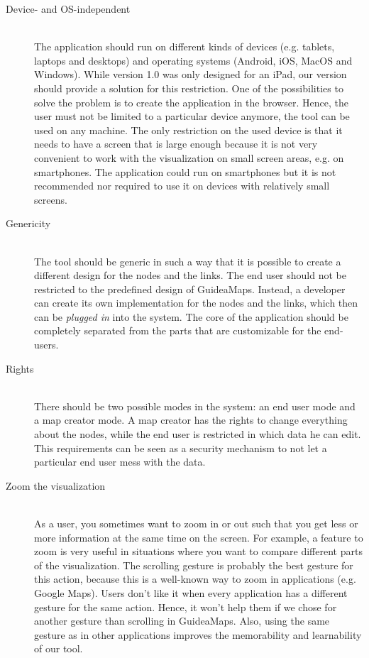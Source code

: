 \begin{description}

	\item[Device- and OS-independent] \hfill \\
	The application should run on different kinds of devices (e.g. tablets, laptops and desktops) and operating systems (Android, iOS, MacOS and Windows). While version 1.0 was only designed for an iPad, our version should provide a solution for this restriction. One of the possibilities to solve the problem is to create the application in the browser. Hence, the user must not be limited to a particular device anymore, the tool can be used on any machine. The only restriction on the used device is that it needs to have a screen that is large enough because it is not very convenient to work with the visualization on small screen areas, e.g. on smartphones. The application could run on smartphones but it is not recommended nor required to use it on devices with relatively small screens.
  
	\item[Genericity] \hfill \\
  The tool should be generic in such a way that it is possible to create a different design for the nodes and the links. The end user should not be restricted to the predefined design of GuideaMaps. Instead, a developer can create its own implementation for the nodes and the links, which then can be \textit{plugged in} into the system. The core of the application should be completely separated from the parts that are customizable for the end-users.
  
	\item[Rights] \hfill \\
	There should be two possible modes in the system: an end user mode and a map creator mode. A map creator has the rights to change everything about the nodes, while the end user is restricted in which data he can edit. This requirements can be seen as a security mechanism to not let a particular end user mess with the data.
  
	\item[Zoom the visualization] \hfill \\
	As a user, you sometimes want to zoom in or out such that you get less or more information at the same time on the screen. For example, a feature to zoom is very useful in situations where you want to compare different parts of the visualization. The scrolling gesture is probably the best gesture for this action, because this is a well-known way to zoom in applications (e.g. Google Maps). Users don't like it when every application has a different gesture for the same action. Hence, it won't help them if we chose for another gesture than scrolling in GuideaMaps. Also, using the same gesture as in other applications improves the memorability and learnability of our tool.
	

\end{description}
